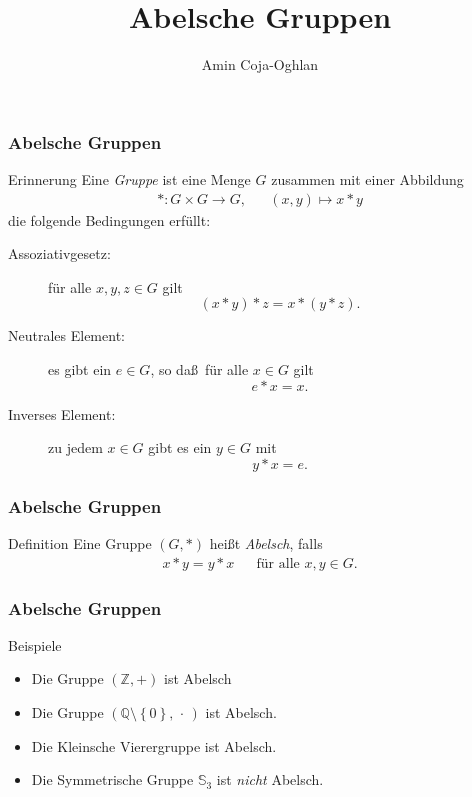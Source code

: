 \documentclass{beamer}
\title[Linadi]{Abelsche Gruppen}
\author[Amin Coja-Oghlan]{Amin Coja-Oghlan}
\institute[Frankfurt]{JWGUFFM}
\date{}
\renewcommand{\emph}[1]{{\textcolor{solarizedRed}{\itshape #1}}}
\newcommand\ZZ{\mathbb Z}
\newcommand\QQ{\mathbb Q}
\renewcommand\SS{\mathbb S}
\newcommand\cbc[1]{\left\{{#1}\right\}}
\newcommand{\ue}{\"u}
\begin{document}
\frame[plain]{\titlepage}

\begin{frame}\frametitle{Abelsche Gruppen}
	\begin{block}{Erinnerung}
		Eine \emph{Gruppe} ist eine Menge $G$ zusammen mit einer Abbildung 
		\begin{align*}
			*:G\times G\to G,&&(x,y)\mapsto x*y
		\end{align*}
 die folgende Bedingungen erf\"ullt:
		\begin{description}
			\item[Assoziativgesetz:] f\ue r alle $x,y,z\in G$ gilt $$(x*y)*z=x*(y*z).$$
			\item[Neutrales Element:] es gibt ein $e\in G$, so da\ss\ f\ue r alle $x\in G$ gilt $$e*x=x.$$
			\item[Inverses Element:] zu jedem $x\in G$ gibt es ein $y\in G$ mit $$y*x=e.$$
		\end{description}
	\end{block}
\end{frame}

\begin{frame}\frametitle{Abelsche Gruppen}
	\begin{block}{Definition}
		Eine Gruppe $(G,*)$ hei\ss t \emph{Abelsch}, falls
		\begin{align*}
			x*y=y*x&&\mbox{f\ue r alle }x,y\in G.
		\end{align*}
	\end{block}
\end{frame}

\begin{frame}\frametitle{Abelsche Gruppen}
	\begin{block}{Beispiele}
	\begin{itemize}
		\item Die Gruppe $(\ZZ,+)$ ist Abelsch
		\item Die Gruppe $(\QQ\setminus\cbc 0,\,\cdot\,)$ ist Abelsch.
		\item Die Kleinsche Vierergruppe ist Abelsch.
		\item Die Symmetrische Gruppe $\SS_3$ ist \emph{nicht} Abelsch.
	\end{itemize}
	\end{block}
\end{frame}
\end{document}
